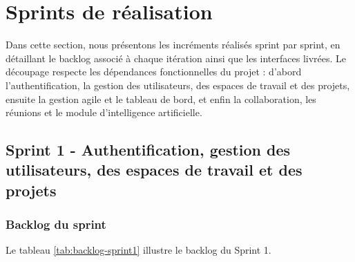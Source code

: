 \normalsize

\section{Sprints de réalisation}

Dans cette section, nous présentons les incréments réalisés sprint par sprint, en détaillant le backlog associé à chaque itération ainsi que les interfaces livrées. Le découpage respecte les dépendances fonctionnelles du projet : d'abord l'authentification, la gestion des utilisateurs, des espaces de travail et des projets, ensuite la gestion agile et le tableau de bord, et enfin la collaboration, les réunions et le module d'intelligence artificielle.

\subsection{Sprint 1 - Authentification, gestion des utilisateurs, des espaces de travail et des projets}
\subsubsection{Backlog du sprint}
Le tableau \ref{tab:backlog-sprint1} illustre le backlog du Sprint 1.

